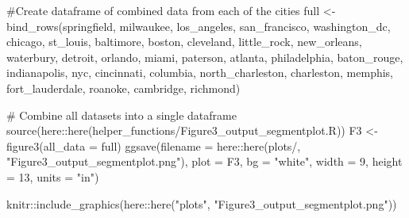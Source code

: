 \documentclass[
  letterpaper,
  DIV=11,
  numbers=noendperiod]{scrartcl}
\newenvironment{Shaded}{\begin{snugshade}}{\end{snugshade}}
\newcommand{\AttributeTok}[1]{\textcolor[rgb]{0.40,0.45,0.13}{#1}}
\newcommand{\CommentTok}[1]{\textcolor[rgb]{0.37,0.37,0.37}{#1}}
\newcommand{\DecValTok}[1]{\textcolor[rgb]{0.68,0.00,0.00}{#1}}
\newcommand{\FunctionTok}[1]{\textcolor[rgb]{0.28,0.35,0.67}{#1}}
\newcommand{\NormalTok}[1]{\textcolor[rgb]{0.00,0.23,0.31}{#1}}
\newcommand{\OtherTok}[1]{\textcolor[rgb]{0.00,0.23,0.31}{#1}}
\newcommand{\SpecialCharTok}[1]{\textcolor[rgb]{0.37,0.37,0.37}{#1}}
\newcommand{\StringTok}[1]{\textcolor[rgb]{0.13,0.47,0.30}{#1}}
\begin{document}
\begin{Shaded}
\begin{Highlighting}[]
\CommentTok{\#Create dataframe of combined data from each of the cities}
\NormalTok{full }\OtherTok{\textless{}{-}} \FunctionTok{bind\_rows}\NormalTok{(springfield, milwaukee, los\_angeles, san\_francisco, washington\_dc, }
\NormalTok{                      chicago, st\_louis, baltimore, boston, cleveland, little\_rock, }
\NormalTok{                      new\_orleans, waterbury, detroit, orlando, miami, paterson, atlanta, }
\NormalTok{                      philadelphia, baton\_rouge, indianapolis, nyc, cincinnati, columbia, }
\NormalTok{                      north\_charleston, charleston, memphis, fort\_lauderdale, roanoke, }
\NormalTok{                      cambridge, richmond)}

\CommentTok{\# Combine all datasets into a single dataframe}
\FunctionTok{source}\NormalTok{(here}\SpecialCharTok{::}\FunctionTok{here}\NormalTok{(}\StringTok{\textquotesingle{}helper\_functions/Figure3\_output\_segmentplot.R\textquotesingle{}}\NormalTok{))}
\NormalTok{F3 }\OtherTok{\textless{}{-}} \FunctionTok{figure3}\NormalTok{(}\AttributeTok{all\_data =}\NormalTok{ full)}
\FunctionTok{ggsave}\NormalTok{(}\AttributeTok{filename =}\NormalTok{ here}\SpecialCharTok{::}\FunctionTok{here}\NormalTok{(}\StringTok{\textquotesingle{}plots/\textquotesingle{}}\NormalTok{, }\StringTok{"Figure3\_output\_segmentplot.png"}\NormalTok{),}
       \AttributeTok{plot =}\NormalTok{ F3, }
       \AttributeTok{bg =} \StringTok{"white"}\NormalTok{, }\AttributeTok{width =} \DecValTok{9}\NormalTok{, }\AttributeTok{height =} \DecValTok{13}\NormalTok{, }\AttributeTok{units =} \StringTok{"in"}\NormalTok{)}

\NormalTok{knitr}\SpecialCharTok{::}\FunctionTok{include\_graphics}\NormalTok{(here}\SpecialCharTok{::}\FunctionTok{here}\NormalTok{(}\StringTok{"plots"}\NormalTok{, }\StringTok{"Figure3\_output\_segmentplot.png"}\NormalTok{))}
\end{Highlighting}
\end{Shaded}
\end{document}
